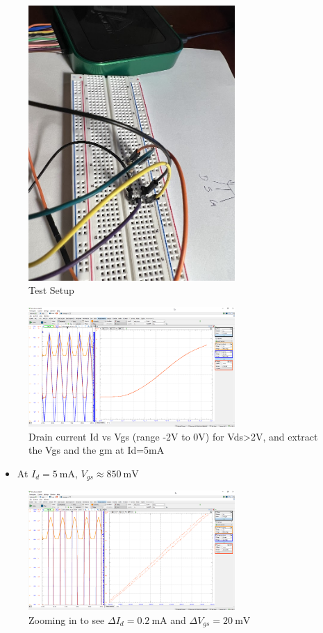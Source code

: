 \documentclass{article}
\begin{document}
	\begin{figure}[H]
	    \centering
	    \includegraphics[width=0.7\textwidth]{3b-photo}
	    \caption{Test Setup}
	\end{figure}

	
	\begin{figure}[H]
	    \centering
	    \includegraphics[width=0.7\textwidth]{3b}
	    \caption{Drain current Id vs Vgs (range -2V to 0V) for Vds>2V, and extract the Vgs and the gm at Id=5mA}
	\end{figure}
	
	\begin{itemize}
		\item At $I_d = \SI{5}{\mA}$, $V_{gs} \approx \SI{850}{\mV}$
	\end{itemize}
	
	\begin{figure}[H]
	    \centering
	    \includegraphics[width=0.7\textwidth]{3b-2}
	    \caption{Zooming in to see $\Delta I_d = \SI{0.2}{\mA}$ and $\Delta V_{gs} = \SI{20}{\mV}$}
	\end{figure}
	
\end{document}

